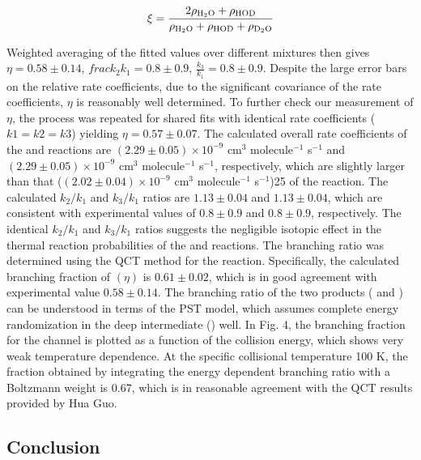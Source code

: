 \begin{equation}
	\xi = \frac{2 \rho_{\ce{H2O}} + \rho_{\ce{HOD}}}{\rho_{\ce{H2O}} + \rho_{\ce{HOD}} + \rho_{\ce{D2O}}}
\end{equation}

Weighted averaging of the fitted values over different mixtures then gives $\eta = 0.58 \pm 0.14$, $frac{k_2}{k_1} = 0.8 \pm 0.9$, $\frac{k_3}{k_1} = 0.8 \pm 0.9$. Despite the large error bars on the relative rate coefficients, due to the significant covariance of the rate coefficients, $\eta$ is reasonably well determined. To further check our measurement of $\eta$, the process was repeated for shared fits with identical rate coefficients ($k1 = k2 = k3$) yielding $\eta = 0.57 \pm 0.07$. The calculated overall rate coefficients of the  and  reactions are $(2.29 \pm 0.05) \times 10^{-9}$ cm$^3$ molecule$^{-1}$ s$^{-1}$ and $(2.29 \pm 0.05) \times 10^{-9}$ cm$^3$ molecule$^{-1}$ s$^{-1}$, respectively, which are slightly larger than that ($(2.02 \pm 0.04) \times 10^{-9}$ cm$^3$ molecule$^{-1}$ s$^{-1}$)25 of the  reaction. The calculated $k_2/k_1$ and $k_3/k_1$ ratios are $1.13 \pm 0.04$ and $1.13 \pm 0.04$, which are consistent with experimental values of $0.8 \pm 0.9$ and $0.8 \pm 0.9$, respectively. The identical $k_2/k_1$ and $k_3/k_1$ ratios suggests the negligible isotopic effect in the thermal reaction probabilities of the  and  reactions. The branching ratio was determined using the QCT method for the  reaction. Specifically, the calculated branching fraction of  $(\eta)$ is $0.61 \pm 0.02$, which is in good agreement with experimental value $0.58 \pm 0.14$. The branching ratio of the two products ( and ) can be understood in terms of the PST model, which assumes complete energy randomization in the deep intermediate () well. In Fig. 4, the branching fraction for the  channel is plotted as a function of the collision energy, which shows very weak temperature dependence. At the specific collisional temperature 100 K, the fraction obtained by integrating the energy dependent branching ratio with a Boltzmann weight is 0.67, which is in reasonable agreement with the QCT results provided by Hua Guo.\cite{Chen2018}

\subsection{Conclusion}

